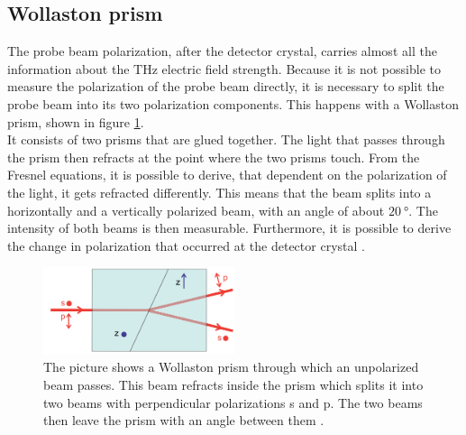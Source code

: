 \subsection{Wollaston prism}
\label{sec:wollaston}
The probe beam polarization, after the detector crystal, carries almost all the information about the $\si{\tera\hertz}$ electric field strength.
Because it is not possible to measure the polarization of the probe beam directly, it is necessary to split the probe beam into its two polarization components.
This happens with a Wollaston prism, shown in figure \ref{fig:wollaston}.
\\
It consists of two prisms that are glued together.
The light that passes through the prism then refracts at the point where the two prisms touch.
From the Fresnel equations, it is possible to derive, that dependent on the polarization of the light, it gets refracted differently.
This means that the beam splits into a horizontally and a vertically polarized beam, with an angle of about $\SI{20}{\degree}$.
The intensity of both beams is then measurable.
Furthermore, it is possible to derive the change in polarization that occurred at the detector crystal \cite{wollaston_prism}. 
\begin{figure}
    \centering
    \includegraphics[width=0.5\textwidth]{Plots/wollaston_prism.png}
    \caption{The picture shows a Wollaston prism through which an unpolarized beam passes.
    This beam refracts inside the prism which splits it into two beams with perpendicular polarizations s and p.
    The two beams then leave the prism with an angle between them \cite{wollaston_prism}.}
    \label{fig:wollaston}
\end{figure}

